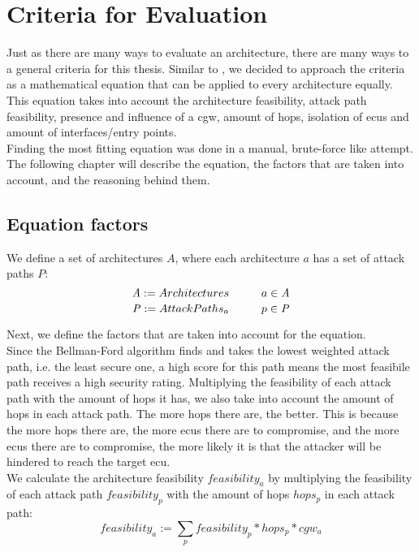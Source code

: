 \chapter{Criteria for Evaluation}
\label{chp:criteria}

Just as there are many ways to evaluate an architecture, there are many ways to a general criteria for this thesis.
Similar to \cite{threat_surf}, we decided to approach the criteria as a mathematical equation that can be applied to every architecture equally.
This equation takes into account the architecture feasibility, attack path feasibility, presence and influence of a \gls{cgw},
amount of hops, isolation of \gls{ecu}s and amount of interfaces/entry points.\\

Finding the most fitting equation was done in a manual, brute-force like attempt.
The following chapter will describe the equation, the factors that are taken into account, and the reasoning behind them.\\

\section{Equation factors}
\label{sec:equation_factors}

We define a set of architectures $\mathit{A}$, where each architecture $a$ has a set of attack paths $\mathit{P}$:\\
\begin{equation}
    \mathit{A} := {Architectures} \hspace*{1cm} a \in \mathit{A} \label{eq:architectures}
\end{equation}
\begin{equation}
    \mathit{P} := {Attack Paths_{a}} \hspace*{1cm} p \in \mathit{P} \label{eq:attack_paths}
\end{equation}

\hfill \break

Next, we define the factors that are taken into account for the equation.\\

Since the Bellman-Ford algorithm finds and takes the lowest weighted attack path, i.e. the least secure one, 
a high score for this path means the most feasibile path receives a high security rating.
Multiplying the feasibility of each attack path with the amount of hops it has, we also take into account the amount of hops in each attack path.
The more hops there are, the better.
This is because the more hops there are, the more \gls{ecu}s there are to compromise, 
and the more \gls{ecu}s there are to compromise, the more likely it is that the attacker will be hindered to reach the target \gls{ecu}.\\
We calculate the architecture feasibility $feasibility_{a}$ by multiplying the feasibility of each attack path $feasibility_{p}$ with the amount of hops $hops_{p}$ in each attack path:
\begin{equation}
    feasibility_{a} := \sum_{p} feasibility_{p} * hops_{p} * cgw_{a} \label{eq:feasibility}
\end{equation}

